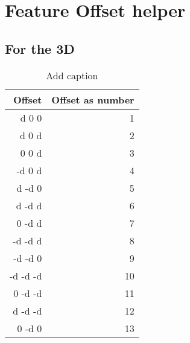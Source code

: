 \chapter{Feature Offset helper}

\section{For the 3D}

\begin{table}[H]
  \centering
    \begin{tabular}{|r|r|}
    \hline
    Offset & Offset as number \\ \hline
    d 0 0 & 1 \\ \hline
    d 0 d & 2 \\ \hline
    0 0 d & 3 \\ \hline
    -d 0 d & 4 \\ \hline
    d -d 0 & 5 \\ \hline
    d -d d & 6 \\ \hline
    0 -d d & 7 \\ \hline
    -d -d d & 8 \\ \hline
    -d -d 0 & 9 \\ \hline
    -d -d -d & 10 \\ \hline
    0 -d -d & 11 \\ \hline
    d -d -d & 12 \\ \hline 
    0 -d 0 & 13 \\ \hline
    \end{tabular}%
  \caption{Add caption}\label{tab:addlabel}%
\end{table}%
